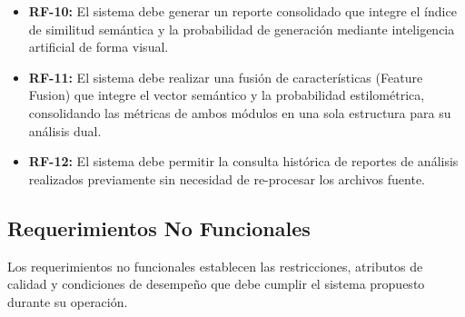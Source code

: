 \begin{itemize}
	\item \textbf{RF-10:} El sistema debe generar un reporte consolidado que integre el índice de similitud semántica y la probabilidad de generación mediante inteligencia artificial de forma visual.

	\item \textbf{RF-11:} El sistema debe realizar una fusión de características (Feature Fusion) que integre el vector semántico y la probabilidad estilométrica, consolidando las métricas de ambos módulos en una sola estructura para su análisis dual.

	\item \textbf{RF-12:} El sistema debe permitir la consulta histórica de reportes de análisis realizados previamente sin necesidad de re-procesar los archivos fuente.
\end{itemize}

\subsection{Requerimientos No Funcionales}

Los requerimientos no funcionales establecen las restricciones, atributos de calidad y condiciones de desempeño que debe cumplir el sistema propuesto durante su operación.

